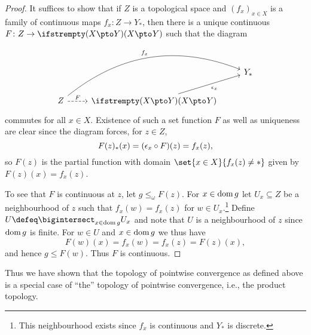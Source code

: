 \begin{proof}
    It suffices to show that if $Z$ is a topological space and $(f_x)_{x \in X}$ is a family of continuous maps $f_x \colon Z \to Y_*$, then there is a unique continuous $F \colon Z \to \pmaps{X}{Y}$ such that the diagram
    \begin{equation*}
        \begin{tikzcd}
            && Y_* \\
            Z
                \ar[urr, "f_x", bend left]
                \ar[dashed, r, "F"]
            & \pmaps{X}{Y}
                \ar[ur, "{\ev[x]}", swap]
        \end{tikzcd}
    \end{equation*}
    commutes for all $x \in X$. Existence of such a set function $F$ as well as uniqueness are clear since the diagram forces, for $z \in Z$,
    \begin{equation*}
        F(z)_*(x)
            = (\ev[x] \circ F)(z)
            = f_x(z),
    \end{equation*}
    so $F(z)$ is the partial function with domain $\set{x \in X}{f_x(z) \neq *}$ given by $F(z)(x) = f_x(z)$.

    To see that $F$ is continuous at $z$, let $g \leq_\omega F(z)$. For $x \in \dom{g}$ let $U_x \subseteq Z$ be a neighbourhood of $z$ such that $f_x(w) = f_x(z)$ for $w \in U_x$.\footnote{This neighbourhood exists since $f_x$ is continuous and $Y_*$ is discrete.} Define $U \defeq \bigintersect_{x \in \dom{g}} U_x$ and note that $U$ is a neighbourhood of $z$ since $\dom{g}$ is finite. For $w \in U$ and $x \in \dom{g}$ we thus have
    \begin{equation*}
        F(w)(x)
            = f_x(w)
            = f_x(z)
            = F(z)(x),
    \end{equation*}
    and hence $g \leq F(w)$. Thus $F$ is continuous.
\end{proof}
%
Thus we have shown that the topology of pointwise convergence as defined above is a special case of \enquote{the} topology of pointwise convergence, i.e., the product topology.



